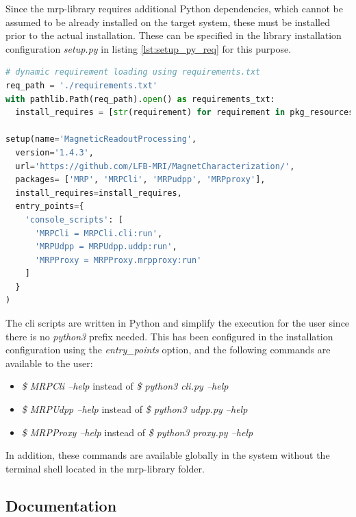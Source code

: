 Since the \gls{mrp}-library requires additional Python dependencies,
which cannot be assumed to be already installed on the target system,
these must be installed prior to the actual installation. These can be
specified in the library installation configuration \emph{setup.py} in
listing \ref{lst:setup_py_req} for this purpose.

\newpage

\begin{lstlisting}[language=Python, caption={setup.py with dynamic requirement parsing using a given requirements.txt}, label=lst:setup_py_req]
# dynamic requirement loading using requirements.txt
req_path = './requirements.txt'
with pathlib.Path(req_path).open() as requirements_txt:
  install_requires = [str(requirement) for requirement in pkg_resources.parse_requirements(requirements_txt)]

setup(name='MagneticReadoutProcessing',
  version='1.4.3',
  url='https://github.com/LFB-MRI/MagnetCharacterization/',
  packages= ['MRP', 'MRPCli', 'MRPudpp', 'MRPproxy'],
  install_requires=install_requires,
  entry_points={
    'console_scripts': [
      'MRPCli = MRPCli.cli:run',
      'MRPUdpp = MRPUdpp.uddp:run',
      'MRPProxy = MRPProxy.mrpproxy:run'
    ]
  }
)
\end{lstlisting}

The \gls{cli} scripts are written in Python and simplify the execution
for the user since there is no \emph{python3} prefix needed. This has
been configured in the installation configuration using the
\emph{entry\_points} option, and the following commands are available to
the user:

\begin{itemize}
\tightlist
\item
  \emph{\$ MRPCli --help} instead of \emph{\$ python3 cli.py --help}
\item
  \emph{\$ MRPUdpp --help} instead of \emph{\$ python3 udpp.py --help}
\item
  \emph{\$ MRPProxy --help} instead of \emph{\$ python3 proxy.py --help}
\end{itemize}

In addition, these commands are available globally in the system without
the terminal shell located in the \gls{mrp}-library folder.

\hypertarget{documentation}{%
\subsection{Documentation}\label{documentation}}

